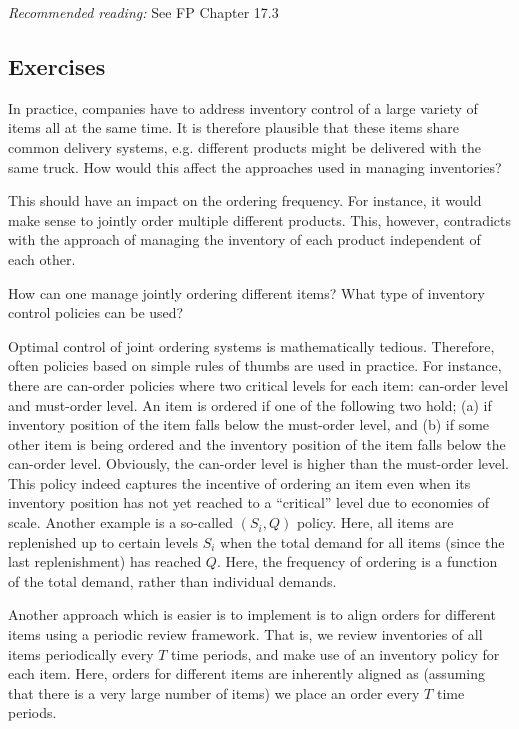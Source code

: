 \textit{Recommended reading:} See FP Chapter 17.3


\subsection{Exercises}
\label{sec:exercises}



\begin{exercise}
In practice, companies have to address inventory control of a large variety of items all at the same time. It is therefore plausible that these items share common delivery systems, e.g. different products might be delivered with the same truck. How would this affect the approaches used in managing inventories?


\begin{solution}
This should have an impact on the ordering frequency. For instance, it would make sense to jointly order multiple different products. This, however, contradicts with the approach of managing the inventory of each product independent of each other. 
\end{solution}
\end{exercise}

\begin{exercise}
How can one manage jointly ordering different items? What type of inventory control policies can be used? 


\begin{solution}
Optimal control of joint ordering systems is mathematically tedious. Therefore, often policies based on simple rules of thumbs are used in practice. For instance, there are can-order policies where two critical levels for each item: can-order level and must-order level. An item is ordered if one of the following two hold; (a) if inventory position of the item falls below the must-order level, and (b) if some other item is being ordered and the inventory position of the item falls below the can-order level. Obviously, the can-order level is higher than the must-order level. This policy indeed captures the incentive of ordering an item even when its inventory position has not yet reached to a ``critical'' level due to economies of scale. Another example is a so-called $(S_i,Q)$ policy. Here, all items are replenished up to certain levels $S_i$ when the total demand for all items (since the last replenishment) has reached $Q$. Here, the frequency of ordering is a function of the total demand, rather than individual demands.  

Another approach which is easier is to implement is to align orders for different items using a periodic review framework. That is, we review inventories of all items periodically every $T$ time periods, and make use of an inventory policy for each item. Here, orders for different items are inherently aligned as (assuming that there is a very large number of items) we place an order every $T$ time periods.
\end{solution}
\end{exercise}

